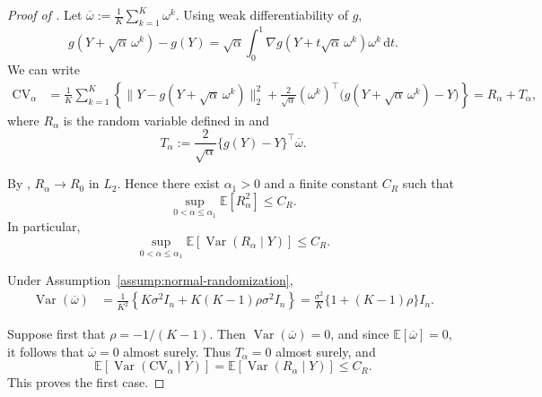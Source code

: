 \documentclass[12pt]{article}
\newcommand{\tran}{^\intercal}
\newcommand{\rd}{{\mathrm{d}}}
\theoremstyle{general}
\newcommand{\cv}{{\mathrm{CV}}}
\begin{document}
\begin{proof}[Proof of ]
Let $\overline\omega:=\frac1K\sum_{k=1}^K\omega^k$.
Using weak differentiability of $g$,
\[
g(Y+\sqrt\alpha\,\omega^k)-g(Y)
=
\sqrt\alpha\int_0^1
\nabla g(Y+t\sqrt\alpha\,\omega^k)\omega^k\,\rd t.
\]
We can write
\begin{align*}
\cv_\alpha
&=
\frac1K\sum_{k=1}^K
\left\{
\|Y-g(Y+\sqrt\alpha\,\omega^k)\|_2^2
+
\frac{2}{\sqrt\alpha}
(\omega^k)\tran
\bigl(g(Y+\sqrt\alpha\,\omega^k)-Y\bigr)
\right\}=
R_\alpha+T_\alpha,
\end{align*}
where $R_\alpha$ is the random variable defined in
 and
\[
T_\alpha
:=
\frac{2}{\sqrt\alpha}
\{g(Y)-Y\}\tran\overline\omega.
\]


By ,
$R_\alpha\to R_0$ in $L_2$. Hence there exist
$\alpha_1>0$ and a finite constant $C_R$ such that
\[
\sup_{0<\alpha\leq\alpha_1}
\mathbb E[R_\alpha^2]
\leq C_R.
\]
In particular,
\[
\sup_{0<\alpha\leq\alpha_1}
\mathbb E\!\left[\operatorname{Var}(R_\alpha\mid Y)\right]
\leq C_R.
\]

Under Assumption~\ref{assump:normal-randomization},
\begin{align*}
\operatorname{Var}(\overline\omega)
&=
\frac{1}{K^2}
\left\{
K\sigma^2I_n+
K(K-1)\rho\sigma^2I_n
\right\}=
\frac{\sigma^2}{K}
\{1+(K-1)\rho\}I_n.
\end{align*}

Suppose first that $\rho=-1/(K-1)$. Then
$\operatorname{Var}(\overline\omega)=0$, and since
$\mathbb E[\overline\omega]=0$, it follows that
$\overline\omega=0$ almost surely. Thus $T_\alpha=0$ almost surely, and
\[
\mathbb E\!\left[
\operatorname{Var}(\cv_\alpha\mid Y)
\right]
=
\mathbb E\!\left[
\operatorname{Var}(R_\alpha\mid Y)
\right]
\leq C_R.
\]
This proves the first case.


\end{proof}
\end{document}
